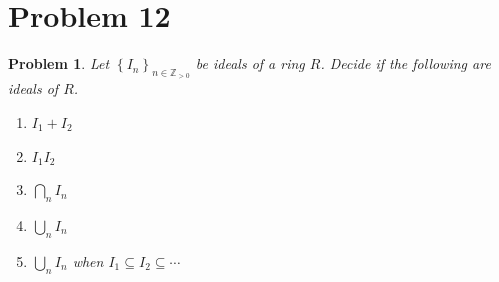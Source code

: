 \documentclass[11pt, letterpaper]{article}
\theoremstyle{plain}
\newtheorem{problem}{Problem}[section]
\begin{document}
\section{Problem 12}
\begin{problem}
	Let $\left\{ I_n \right\}_{n\in\mathbb{Z}_{> 0} } $ be ideals of a ring $R$. Decide if the following are ideals of $R$.
	\begin{enumerate}
		\item $I_1+I_2$
		\item $I_1I_2$
		\item $\bigcap_{n} I_n$
		\item $\bigcup_{n} I_n$
		\item $\bigcup_{n} I_n$ when $I_1 \subseteq I_2 \subseteq \cdots$
	\end{enumerate}
\end{problem}
\end{document}
